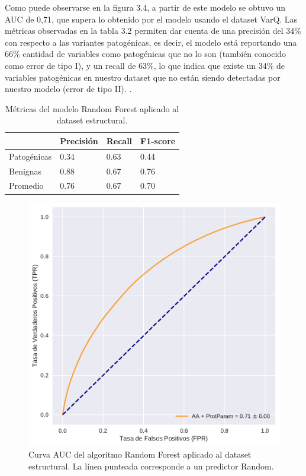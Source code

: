 Como puede observarse en la figura 3.4, a partir de este modelo se obtuvo un AUC de 0,71, que supera lo obtenido por el modelo usando el dataset VarQ. Las métricas observadas en la tabla 3.2 permiten dar cuenta de una precisión del 34\% con respecto a las variantes patogénicas, es decir, el modelo está reportando una 66\% cantidad de variables como patogénicas que no lo son (también conocido como error de tipo I), y un recall de 63\%, lo que indica que existe un 34\% de variables patogénicas en nuestro dataset que no están siendo detectadas por nuestro modelo (error de tipo II). .

\begin{table}[H]
\centering
\begin{tabular}{|l|l|l|l|}
\hline
              & Precisión & Recall & F1-score \\ \hline
Patogénicas   & 0.34      & 0.63   & 0.44     \\ \hline
Benignas      & 0.88      & 0.67   & 0.76     \\ \hline
Promedio      & 0.76      & 0.67   & 0.70     \\ \hline
\end{tabular}
\caption{Métricas del modelo Random Forest aplicado al dataset estructural.}
\label{my-label}
\end{table}


\begin{figure}[h]
    \centering
    \includegraphics[scale=0.55]{documents/latex/figures/3/auc_1.pdf}
    \caption{Curva AUC del algoritmo Random Forest aplicado al dataset estructural. La línea punteada corresponde a un predictor Random.}
    \label{fig:auc_1}
\end{figure}

